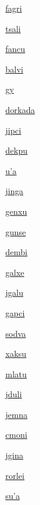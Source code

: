 {\hyperlink{val:fagri}{fagri}}{}{}{}

{\hyperlink{val:tsali}{tsali}}{}{}{}

{\hyperlink{val:fancu}{fancu}}{}{}{}

{\hyperlink{val:balvi}{balvi}}{}{}{}

{\hyperlink{val:gy}{gy}}{}{}{}

{\hyperlink{val:dorkada}{dorkada}}{}{}{}

{\hyperlink{val:jipci}{jipci}}{}{}{}

{\hyperlink{val:dekpu}{dekpu}}{}{}{}

{\hyperlink{val:uha}{u'a}}{}{}{}

{\hyperlink{val:jinga}{jinga}}{}{}{}

{\hyperlink{val:genxu}{genxu}}{}{}{}

{\hyperlink{val:gunse}{gunse}}{}{}{}

{\hyperlink{val:dembi}{dembi}}{}{}{}

{\hyperlink{val:galxe}{galxe}}{}{}{}

{\hyperlink{val:jgalu}{jgalu}}{}{}{}

{\hyperlink{val:gapci}{gapci}}{}{}{}

{\hyperlink{val:sodva}{sodva}}{}{}{}

{\hyperlink{val:xaksu}{xaksu}}{}{}{}

{\hyperlink{val:mlatu}{mlatu}}{}{}{}

{\hyperlink{val:jduli}{jduli}}{}{}{}

{\hyperlink{val:jemna}{jemna}}{}{}{}

{\hyperlink{val:cmoni}{cmoni}}{}{}{}

{\hyperlink{val:jgina}{jgina}}{}{}{}

{\hyperlink{val:rorlei}{rorlei}}{}{}{}

{\hyperlink{val:suha}{su'a}}{}{}{}


